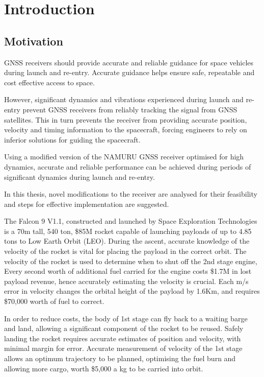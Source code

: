 \chapter{Introduction}\label{ch:intro}

\section{Motivation}
\ac{GNSS} receivers should provide accurate and reliable guidance for space vehicles during launch and re-entry. Accurate guidance helps ensure safe, repeatable and cost effective access to space.

However, significant dynamics and vibrations experienced during launch and re-entry prevent \ac{GNSS} receivers from reliably tracking the signal from \ac{GNSS} satellites. This in turn prevents the receiver from providing accurate position, velocity and timing information to the spacecraft, forcing engineers to rely on inferior solutions for guiding the spacecraft.

Using a modified version of the \ac{NAMURU} \ac{GNSS} receiver optimised for high dynamics, accurate and reliable performance can be achieved during periods of significant dynamics during launch and re-entry. 

In this thesis, novel modifications to the receiver are analysed for their feasibility and steps for effective implementation are suggested.


The Falcon 9 V1.1, constructed and launched by
Space Exploration Technologies is a 70m tall, 540
ton, \$85M rocket capable of launching payloads of
up to 4.85 tons to Low Earth Orbit (LEO).
During the ascent, accurate knowledge of the
velocity of the rocket is vital for placing the payload
in the correct orbit. The velocity of the rocket is used
to determine when to shut off the 2nd stage engine,
Every second worth of additional fuel carried for the
engine costs \$1.7M in lost payload revenue, hence
accurately estimating the velocity is crucial. Each
m/s error in velocity changes the orbital height of the
payload by 1.6Km, and requires \$70,000 worth of
fuel to correct.

In order to reduce costs, the body of 1st stage can fly
back to a waiting barge and land, allowing a
significant component of the rocket to be reused.
Safely landing the rocket requires accurate
estimates of position and velocity, with minimal
margin for error. Accurate measurement of velocity
of the 1st stage allows an optimum trajectory to be
planned, optimising the fuel burn and allowing more
cargo, worth \$5,000 a kg to be carried into orbit.


